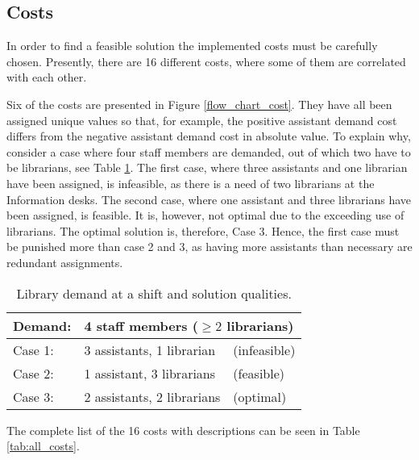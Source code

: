    


\subsection{Costs} \label{cost_section}
In order to find a feasible solution the implemented costs must be carefully chosen. Presently, there are 16 different costs, where some of them are correlated with each other.

Six of the costs are presented in Figure \ref{flow_chart_cost}. They have all been assigned unique values so that, for example, the positive assistant demand cost differs from the negative assistant demand cost in absolute value. To explain why, consider a case where four staff members are demanded, out of which two have to be librarians, see Table \ref{library_solutions}. The first case, where three assistants and one librarian have been assigned, is infeasible, as there is a need of two librarians at the Information desks. The second case, where one assistant and three librarians have been assigned, is feasible. It is, however, not optimal due to the exceeding use of librarians. The optimal solution is, therefore, Case 3. Hence, the first case must be punished more than case 2 and 3, as having more assistants than necessary are redundant assignments.

\begin{table}[!h]
\centering
\caption{Library demand at a shift and solution qualities.}
\label{library_solutions}
\begin{tabular}{|l|l|l|}
\hline
\rowcolor[HTML]{C0C0C0} 
Demand:                         & \multicolumn{2}{l|}{\cellcolor[HTML]{C0C0C0}4 staff members ($\geq 2$ librarians)} \\ \hline
\rowcolor[HTML]{FD6864} 
\cellcolor[HTML]{C0C0C0}Case 1: & 3 assistants, 1 librarian                  & (infeasible)                 \\ \hline
\rowcolor[HTML]{FFFE65} 
\cellcolor[HTML]{C0C0C0}Case 2: & 1 assistant, 3 librarians                  & (feasible)                     \\ \hline
\rowcolor[HTML]{34FF34} 
\cellcolor[HTML]{C0C0C0}Case 3:  & 2 assistants, 2 librarians                 & (optimal)                      \\ \hline
\end{tabular}
\end{table}

The complete list of the 16 costs with descriptions can be seen in Table \ref{tab:all_costs}. 

